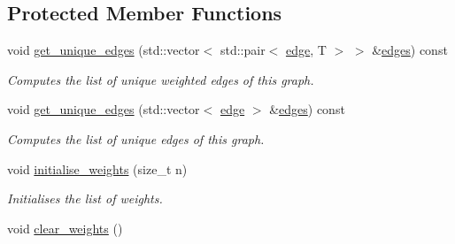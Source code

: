 \subsection*{Protected Member Functions}
\begin{DoxyCompactItemize}
\item 
void \hyperlink{classlgraph_1_1wdgraph_a0d221b722007157df47fd4a59f1e0375}{get\-\_\-unique\-\_\-edges} (std\-::vector$<$ std\-::pair$<$ \hyperlink{namespacelgraph_a76bd7d50719f03de7a85db259d80d572}{edge}, T $>$ $>$ \&\hyperlink{classlgraph_1_1wxgraph_aed7f8e1486d9e2352fc1891521913b4f}{edges}) const 
\begin{DoxyCompactList}\small\item\em Computes the list of unique weighted edges of this graph. \end{DoxyCompactList}\item 
void \hyperlink{classlgraph_1_1wdgraph_a44c3dbbc1f9ace42576592de244bfd35}{get\-\_\-unique\-\_\-edges} (std\-::vector$<$ \hyperlink{namespacelgraph_a76bd7d50719f03de7a85db259d80d572}{edge} $>$ \&\hyperlink{classlgraph_1_1wxgraph_aed7f8e1486d9e2352fc1891521913b4f}{edges}) const 
\begin{DoxyCompactList}\small\item\em Computes the list of unique edges of this graph. \end{DoxyCompactList}\item 
\hypertarget{classlgraph_1_1wxgraph_a3d0eed0195489df5db3e9383a5c91344}{void \hyperlink{classlgraph_1_1wxgraph_a3d0eed0195489df5db3e9383a5c91344}{initialise\-\_\-weights} (size\-\_\-t n)}\label{classlgraph_1_1wxgraph_a3d0eed0195489df5db3e9383a5c91344}

\begin{DoxyCompactList}\small\item\em Initialises the list of weights. \end{DoxyCompactList}\item 
\hypertarget{classlgraph_1_1wxgraph_a805868af4e350ccb6a4555cff3822d22}{void \hyperlink{classlgraph_1_1wxgraph_a805868af4e350ccb6a4555cff3822d22}{clear\-\_\-weights} ()}\label{classlgraph_1_1wxgraph_a805868af4e350ccb6a4555cff3822d22}


\end{DoxyCompactItemize}
